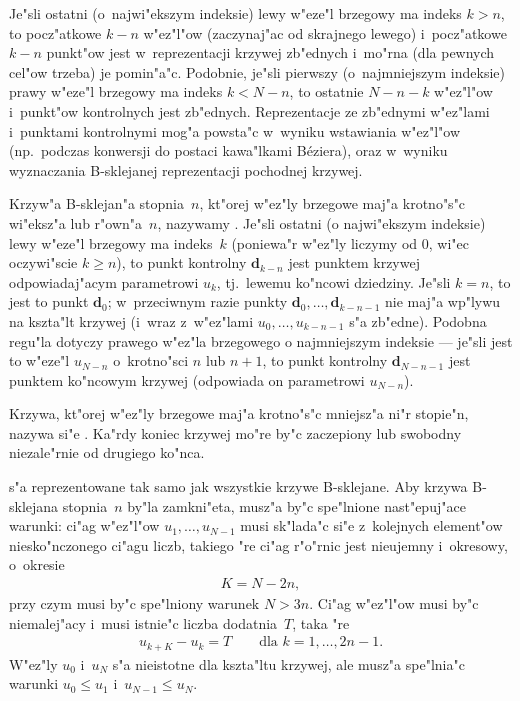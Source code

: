 Je"sli ostatni (o~najwi"ekszym indeksie) lewy w"eze"l brzegowy ma indeks
$k>n$, to pocz"atkowe $k-n$ w"ez"l"ow (zaczynaj"ac od skrajnego lewego)
i~pocz"atkowe $k-n$ punkt"ow jest w~reprezentacji krzywej zb"ednych i~mo"rna
(dla pewnych cel"ow trzeba) je pomin"a"c. Podobnie, je"sli pierwszy
(o~najmniejszym indeksie) prawy w"eze"l brzegowy ma indeks $k<N-n$, to
ostatnie $N-n-k$ w"ez"l"ow i~punkt"ow kontrolnych jest zb"ednych.
Reprezentacje ze zb"ednymi w"ez"lami i~punktami kontrolnymi mog"a powsta"c
w~wyniku wstawiania w"ez"l"ow (np.\ podczas konwersji do postaci kawa"lkami
B\'{e}ziera), oraz w~wyniku wyznaczania B-sklejanej reprezentacji pochodnej
krzywej.

Krzyw"a B-sklejan"a stopnia~$n$, kt"orej w"ez"ly brzegowe maj"a krotno"s"c
wi"eksz"a lub r"own"a~$n$, nazywamy .
Je"sli ostatni (o najwi"ekszym indeksie) lewy w"eze"l brzegowy ma indeks~$k$
(poniewa"r w"ez"ly liczymy od $0$, wi"ec oczywi"scie $k\geq n$), to punkt
kontrolny $\bm{d}_{k-n}$ jest punktem krzywej odpowiadaj"acym parametrowi
$u_k$, tj.\ lewemu ko"ncowi dziedziny. Je"sli $k=n$, to jest to punkt
$\bm{d}_0$; w~przeciwnym razie punkty $\bm{d}_0,\ldots,\bm{d}_{k-n-1}$ nie
maj"a wp"lywu na kszta"lt krzywej (i~wraz z~w"ez"lami $u_0,\ldots,u_{k-n-1}$
s"a zb"edne). Podobna regu"la dotyczy prawego w"ez"la
brzegowego o najmniejszym indeksie --- je"sli jest to w"eze"l $u_{N-n}$
o~krotno"sci $n$ lub $n+1$, to punkt kontrolny $\bm{d}_{N-n-1}$ jest punktem
ko"ncowym krzywej (odpowiada on parametrowi $u_{N-n}$).

Krzywa, kt"orej w"ez"ly brzegowe maj"a krotno"s"c mniejsz"a ni"r stopie"n,
nazywa si"e . Ka"rdy koniec krzywej
mo"re by"c zaczepiony lub swobodny niezale"rnie od drugiego ko"nca.

\vspace{\medskipamount}
 s"a reprezentowane tak samo
jak wszystkie krzywe B-sklejane. Aby krzywa B-sklejana stopnia~$n$ by"la
zamkni"eta, musz"a by"c spe"lnione nast"epuj"ace warunki: ci"ag w"ez"l"ow
$u_1,\ldots,u_{N-1}$ musi sk"lada"c si"e z~kolejnych element"ow
niesko"nczonego ci"agu liczb, takiego "re ci"ag r"o"rnic jest nieujemny
i~okresowy, o~okresie
\begin{align*}
  K=N-2n,
\end{align*}
przy czym musi by"c spe"lniony warunek $N>3n$.
Ci"ag w"ez"l"ow musi by"c niemalej"acy i~musi istnie"c
liczba dodatnia~$T$, taka "re
\begin{align*}
  u_{k+K}-u_k=T\qquad\mbox{dla $k=1,\ldots,2n-1$.}
\end{align*}
W"ez"ly $u_0$ i~$u_N$ s"a nieistotne dla kszta"ltu krzywej, ale musz"a
spe"lnia"c warunki $u_0\leq u_1$ i~$u_{N-1}\leq u_N$.

